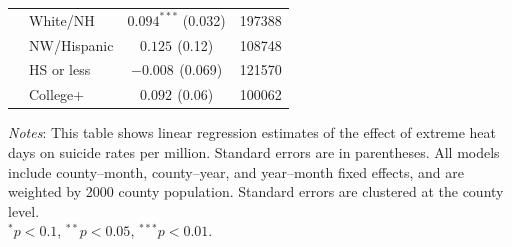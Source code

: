\documentclass[12pt, a4paper]{article}
\begin{document}
\begin{table}[H]
\begin{tabular}{llcc}
 & White/NH & $0.094^{***}$ (0.032) & 197388 \\
 & NW/Hispanic & $0.125^{}$ (0.12) & 108748 \\
 & HS or less & $-0.008^{}$ (0.069) & 121570 \\
 & College+ & $0.092^{}$ (0.06) & 100062 \\
\bottomrule
\end{tabular}
\vspace{0.5em}
\begin{flushleft}
\footnotesize
\textit{Notes}: This table shows linear regression estimates of the effect of extreme heat days on suicide rates per million. Standard errors are in parentheses. All models include county--month, county--year, and year--month fixed effects, and are weighted by 2000 county population. Standard errors are clustered at the county level.\\
$^{*}p<0.1$, $^{**}p<0.05$, $^{***}p<0.01$.
\end{flushleft}
\end{table}
\end{document}
